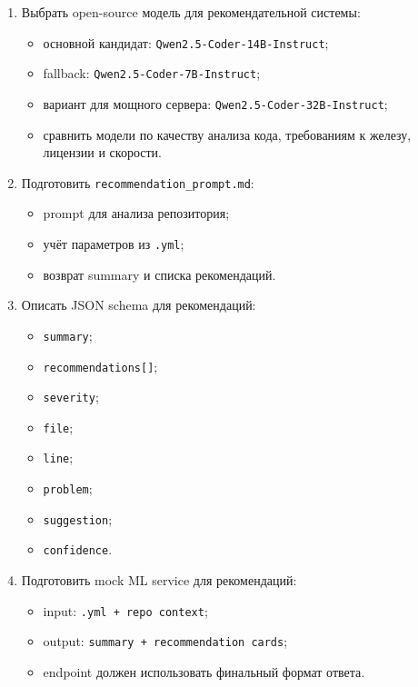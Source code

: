 \documentclass[12pt,a4paper]{article}
\begin{document}
\begin{enumerate}
    \item Выбрать open-source модель для рекомендательной системы:
    \begin{itemize}
        \item основной кандидат: \texttt{Qwen2.5-Coder-14B-Instruct};
        \item fallback: \texttt{Qwen2.5-Coder-7B-Instruct};
        \item вариант для мощного сервера: \texttt{Qwen2.5-Coder-32B-Instruct};
        \item сравнить модели по качеству анализа кода, требованиям к железу, лицензии и скорости.
    \end{itemize}

    \item Подготовить \texttt{recommendation\_prompt.md}:
    \begin{itemize}
        \item prompt для анализа репозитория;
        \item учёт параметров из \texttt{.yml};
        \item возврат summary и списка рекомендаций.
    \end{itemize}

    \item Описать JSON schema для рекомендаций:
    \begin{itemize}
        \item \texttt{summary};
        \item \texttt{recommendations[]};
        \item \texttt{severity};
        \item \texttt{file};
        \item \texttt{line};
        \item \texttt{problem};
        \item \texttt{suggestion};
        \item \texttt{confidence}.
    \end{itemize}

    \item Подготовить mock ML service для рекомендаций:
    \begin{itemize}
        \item input: \texttt{.yml + repo context};
        \item output: \texttt{summary + recommendation cards};
        \item endpoint должен использовать финальный формат ответа.
    \end{itemize}


\end{enumerate}
\end{document}
